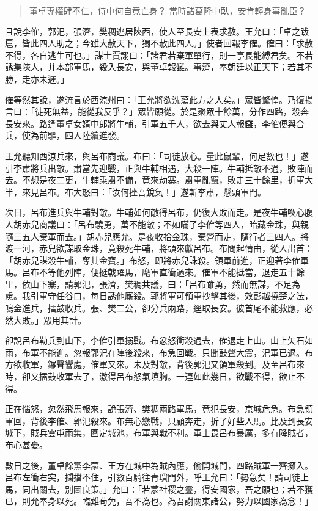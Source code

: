 \begin{quote}
董卓專權肆不仁，侍中何自竟亡身？
當時諸葛隆中臥，安肯輕身事亂臣？
\end{quote}

且說李傕，郭汜，張濟，樊稠逃居陝西，使人至長安上表求赦。王允曰：「卓之跋扈，皆此四人助之；今雖大赦天下，獨不赦此四人。」使者回報李傕。傕曰：「求赦不得，各自逃生可也。」謀士賈詡曰：「諸君若棄軍單行，則一亭長能縛君矣。不若誘集陝人，并本部軍馬，殺入長安，與董卓報讎。事濟，奉朝廷以正天下；若其不勝，走亦未遲。」

傕等然其說，遂流言於西涼州曰：「王允將欲洗蕩此方之人矣。」眾皆驚惶。乃復揚言曰：「徒死無益，能從我反乎？」眾皆願從。於是聚眾十餘萬，分作四路，殺奔長安來。路逢董卓女婿中郎將牛輔，引軍五千人，欲去與丈人報讎，李傕便與合兵，使為前驅，四人陸續進發。

王允聽知西涼兵來，與呂布商議。布曰：「司徒放心。量此鼠輩，何足數也！」遂引李肅將兵出敵。肅當先迎戰，正與牛輔相遇，大殺一陣。牛輔抵敵不過，敗陣而去。不想是夜二更，牛輔乘肅不備，竟來劫寨。肅軍亂竄，敗走三十餘里，折軍大半，來見呂布。布大怒曰：「汝何挫吾銳氣！」遂斬李肅，懸頭軍門。

次日，呂布進兵與牛輔對敵。牛輔如何敵得呂布，仍復大敗而走。是夜牛輔喚心腹人胡赤兒商議曰：「呂布驍勇，萬不能敵；不如瞞了李傕等四人，暗藏金珠，與親隨三五人棄軍而去。」胡赤兒應允。是夜收拾金珠，棄營而走，隨行者三四人。將渡一河，赤兒欲謀取金珠，竟殺死牛輔，將頭來獻呂布。布問起情由，從人出首：「胡赤兒謀殺牛輔，奪其金寶。」布怒，即將赤兒誅殺。領軍前進，正迎著李傕軍馬。呂布不等他列陣，便挺戟躍馬，麾軍直衝過來。傕軍不能抵當，退走五十餘里，依山下寨，請郭汜，張濟，樊稠共議，曰：「呂布雖勇，然而無謀，不足為慮。我引軍守任谷口，每日誘他廝殺。郭將軍可領軍抄擊其後，效彭越撓楚之法，鳴金進兵，擂鼓收兵。張、樊二公，卻分兵兩路，逕取長安。彼首尾不能救應，必然大敗。」眾用其計。

卻說呂布勒兵到山下，李傕引軍搦戰。布忿怒衝殺過去，傕退走上山。山上矢石如雨，布軍不能進。忽報郭汜在陣後殺來，布急回戰。只聞鼓聲大震，汜軍已退。布方欲收軍，鑼聲響處，傕軍又來。未及對敵，背後郭汜又領軍殺到。及至呂布來時，卻又擂鼓收軍去了，激得呂布怒氣填胸。一連如此幾日，欲戰不得，欲止不得。

正在惱怒，忽然飛馬報來，說張濟、樊稠兩路軍馬，竟犯長安，京城危急。布急領軍回，背後李傕、郭汜殺來。布無心戀戰，只顧奔走，折了好些人馬。比及到長安城下，賊兵雲屯雨集，圍定城池，布軍與戰不利。軍士畏呂布暴厲，多有降賊者，布心甚憂。

數日之後，董卓餘黨李蒙、王方在城中為賊內應，偷開城門，四路賊軍一齊擁入。呂布左衝右突，攔擋不住，引數百騎往青瑣門外，呼王允曰：「勢急矣！請司徒上馬，同出關去，別圖良策。」允曰：「若蒙社稷之靈，得安國家，吾之願也；若不獲已，則允奉身以死。臨難苟免，吾不為也。為吾謝關東諸公，努力以國家為念！」

